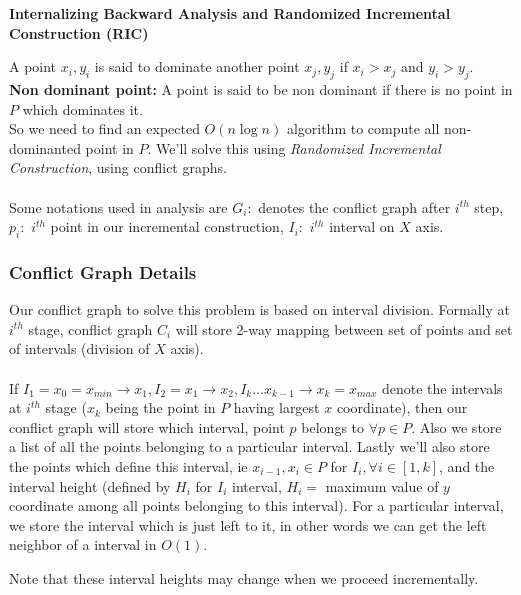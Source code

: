 \documentclass[a4paper]{article}
\begin{document}
\begin{question}[]
\textbf{Internalizing Backward Analysis and Randomized Incremental Construction (RIC)}
\end{question}
A point $x_i, y_i$ is said to dominate another point $x_j, y_j$ if $x_i > x_j$ and $y_i > y_j$. \\
\textbf{Non dominant point: } A point is said to be non dominant if there is no point in $P$ which dominates it. \\
So we need to find an expected $O(n\log n)$ algorithm to compute all non-dominanted point in $P$. We'll solve this using \textit{Randomized Incremental Construction}, using conflict graphs. \\ \\

Some notations used in analysis are $G_i: $ denotes the conflict graph after $i^{th}$ step, $p_i: $ $i^{th}$ point in our incremental construction, $I_i: $ $i^{th}$ interval on $X$ axis.

\subsubsection*{Conflict Graph Details}
Our conflict graph to solve this problem is based on interval division. Formally at $i^{th}$ stage, conflict graph $C_i$ will store 2-way mapping between set of points and set of intervals (division of $X$ axis). \\ \\ 
If $I_1 = x_0 = x_{min}\rightarrow x_1, I_2 = x_1 \rightarrow x_2, I_k \ldots x_{k-1} \rightarrow x_{k} = x_{max}$ denote the intervals at $i^{th}$ stage ($x_k$ being the point in $P$ having largest $x$ coordinate), then our conflict graph will store which interval, point $p$ belongs to $\forall p \in P$. Also we store a list of all the points belonging to a particular interval. Lastly we'll also store the points which define this interval, ie $x_{i-1}, x_i\in P$ for $I_i, \forall i \in [1,k]$, and the interval height (defined by $H_{i}$ for $I_i$ interval, $H_i =$ maximum value of $y$ coordinate among all points belonging to this interval). For a particular interval, we store the interval which is just left to it, in other words we can get the left neighbor of a interval in $O(1)$. 

Note that these interval heights may change when we proceed incrementally.\\ \\
\end{document}
